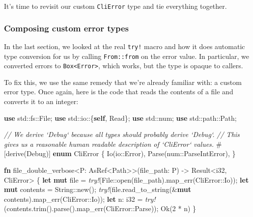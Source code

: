 \documentclass[a4paper,]{book}
\newenvironment{Shaded}{\begin{snugshade}}{\end{snugshade}}
\newcommand{\KeywordTok}[1]{\textcolor[rgb]{0.13,0.29,0.53}{\textbf{{#1}}}}
\newcommand{\DataTypeTok}[1]{\textcolor[rgb]{0.13,0.29,0.53}{{#1}}}
\newcommand{\DecValTok}[1]{\textcolor[rgb]{0.00,0.00,0.81}{{#1}}}
\newcommand{\ConstantTok}[1]{\textcolor[rgb]{0.00,0.00,0.00}{{#1}}}
\newcommand{\CommentTok}[1]{\textcolor[rgb]{0.56,0.35,0.01}{\textit{{#1}}}}
\newcommand{\BuiltInTok}[1]{{#1}}
\newcommand{\PreprocessorTok}[1]{\textcolor[rgb]{0.56,0.35,0.01}{\textit{{#1}}}}
\newcommand{\AttributeTok}[1]{\textcolor[rgb]{0.77,0.63,0.00}{{#1}}}
\newcommand{\NormalTok}[1]{{#1}}
\begin{document}
It's time to revisit our custom \texttt{CliError} type and tie
everything together.

\hypertarget{composing-custom-error-types}{\subsubsection{Composing
custom error types}\label{composing-custom-error-types}}

In the last section, we looked at the real \texttt{try!} macro and how
it does automatic type conversion for us by calling \texttt{From::from}
on the error value. In particular, we converted errors to
\texttt{Box\textless{}Error\textgreater{}}, which works, but the type is
opaque to callers.

To fix this, we use the same remedy that we're already familiar with: a
custom error type. Once again, here is the code that reads the contents
of a file and converts it to an integer:

\begin{Shaded}
\begin{Highlighting}[]
\KeywordTok{use} \NormalTok{std::fs::File;}
\KeywordTok{use} \NormalTok{std::io::\{}\KeywordTok{self}\NormalTok{, Read\};}
\KeywordTok{use} \NormalTok{std::num;}
\KeywordTok{use} \NormalTok{std::path::Path;}

\CommentTok{// We derive `Debug` because all types should probably derive `Debug`.}
\CommentTok{// This gives us a reasonable human readable description of `CliError` values.}
\AttributeTok{#[}\NormalTok{derive}\AttributeTok{(}\BuiltInTok{Debug}\AttributeTok{)]}
\KeywordTok{enum} \NormalTok{CliError \{}
    \NormalTok{Io(io::Error),}
    \NormalTok{Parse(num::ParseIntError),}
\NormalTok{\}}

\KeywordTok{fn} \NormalTok{file_double_verbose<P: AsRef<Path>>(file_path: P) -> }\DataTypeTok{Result}\NormalTok{<}\DataTypeTok{i32}\NormalTok{, CliError> \{}
    \KeywordTok{let} \KeywordTok{mut} \NormalTok{file = }\PreprocessorTok{try!}\NormalTok{(File::open(file_path).map_err(CliError::Io));}
    \KeywordTok{let} \KeywordTok{mut} \NormalTok{contents = }\DataTypeTok{String}\NormalTok{::new();}
    \PreprocessorTok{try!}\NormalTok{(file.read_to_string(&}\KeywordTok{mut} \NormalTok{contents).map_err(CliError::Io));}
    \KeywordTok{let} \NormalTok{n: }\DataTypeTok{i32} \NormalTok{= }\PreprocessorTok{try!}\NormalTok{(contents.trim().parse().map_err(CliError::Parse));}
    \ConstantTok{Ok}\NormalTok{(}\DecValTok{2} \NormalTok{* n)}
\NormalTok{\}}
\end{Highlighting}
\end{Shaded}
\end{document}
